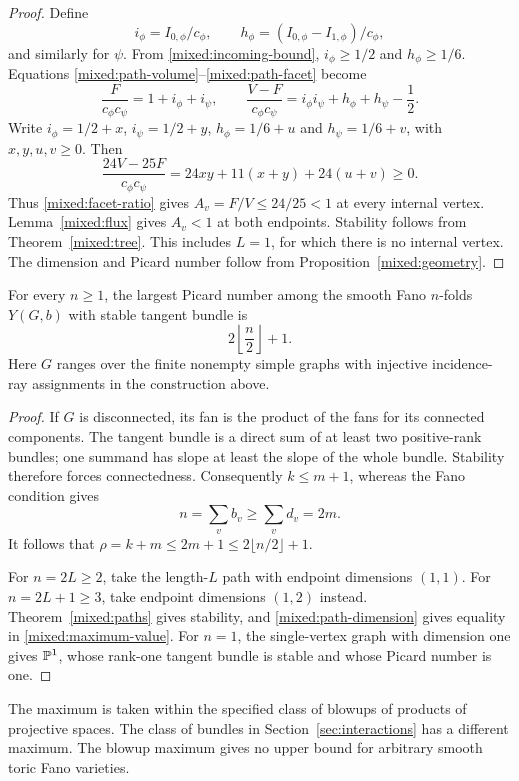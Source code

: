 \begin{proof}
Define
\[
 i_\phi=I_{0,\phi}/c_\phi,\qquad
 h_\phi=(I_{0,\phi}-I_{1,\phi})/c_\phi,
\]
and similarly for $\psi$. From \eqref{mixed:incoming-bound},
$i_\phi\ge1/2$ and $h_\phi\ge1/6$. Equations
\eqref{mixed:path-volume}--\eqref{mixed:path-facet} become
\[
 \frac{F}{c_\phi c_\psi}=1+i_\phi+i_\psi,\qquad
 \frac{V-F}{c_\phi c_\psi}
   =i_\phi i_\psi+h_\phi+h_\psi-\frac12.
\]
Write $i_\phi=1/2+x$, $i_\psi=1/2+y$, $h_\phi=1/6+u$ and
$h_\psi=1/6+v$, with $x,y,u,v\ge0$. Then
\[
 \frac{24V-25F}{c_\phi c_\psi}
   =24xy+11(x+y)+24(u+v)\ge0.
\]
Thus \eqref{mixed:facet-ratio} gives $A_v=F/V\le24/25<1$ at every
internal vertex. Lemma~\ref{mixed:flux} gives $A_v<1$ at both endpoints.
Stability follows from Theorem~\ref{mixed:tree}. This includes $L=1$,
for which there is no internal vertex. The dimension and Picard number follow from
Proposition~\ref{mixed:geometry}.
\end{proof}

\begin{corollary}\label{mixed:maximum}
For every $n\ge1$, the largest Picard number among the smooth Fano
$n$-folds $Y(G,b)$ with stable tangent bundle is
\begin{equation}\label{mixed:maximum-value}
 2\left\lfloor\frac n2\right\rfloor+1.
\end{equation}
Here $G$ ranges over the finite nonempty simple graphs with injective
incidence-ray assignments in the construction above.
\end{corollary}

\begin{proof}
If $G$ is disconnected, its fan is the product of the fans for its
connected components. The tangent bundle is a direct sum of at least
two positive-rank bundles; one summand has slope at least the slope of
the whole bundle. Stability therefore forces connectedness. Consequently
$k\le m+1$, whereas the Fano condition gives
\[
 n=\sum_v b_v\ge\sum_v d_v=2m.
\]
It follows that $\rho=k+m\le2m+1\le2\lfloor n/2\rfloor+1$.

For $n=2L\ge2$, take the length-$L$ path with endpoint dimensions
$(1,1)$. For $n=2L+1\ge3$, take endpoint dimensions $(1,2)$ instead.
Theorem~\ref{mixed:paths} gives stability, and
\eqref{mixed:path-dimension} gives equality in \eqref{mixed:maximum-value}.
For $n=1$, the single-vertex graph with dimension one gives $\mathbb{P}^1$,
whose rank-one tangent bundle is stable and whose Picard number is one.
\end{proof}

The maximum is taken within the specified class of blowups of products
of projective spaces. The class of bundles in
Section~\ref{sec:interactions} has a different maximum. The blowup
maximum gives no upper bound for arbitrary smooth toric Fano varieties.
